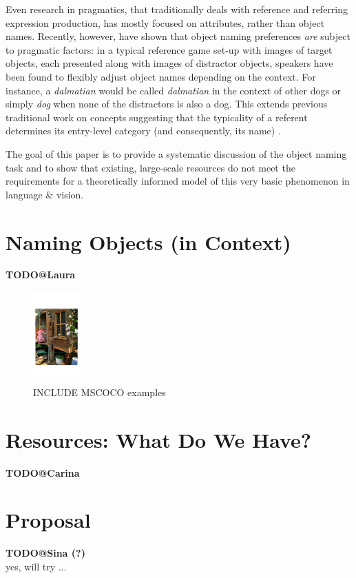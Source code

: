\documentclass[runningheads]{llncs}
\begin{document}
Even research in pragmatics, that traditionally deals with reference and referring expression production, has mostly focused on attributes, rather than object names.
Recently, however, \cite{graf2016animal} have shown that object naming preferences \textit{are} subject to pragmatic factors: in a typical reference game set-up with images of target objects, each  presented along with images of distractor objects, speakers have been found to flexibly adjust object names depending on the context. For instance, a \textit{dalmatian} would be called \textit{dalmatian} in the context of other dogs or simply \textit{dog} when none of the distractors is also a dog.
This extends previous traditional work on concepts suggesting that the typicality of a referent determines its entry-level category (and consequently, its name) \cite{Rosch1978}.

The goal of this paper is to provide a systematic discussion of the object naming task and to show that existing, large-scale resources do not meet the requirements for a theoretically informed model of this very basic phenomenon in language \& vision.


\section{Naming Objects (in Context)}
\label{sec:object_naming}
\textbf{TODO@Laura}\\



\begin{figure}
	\centering
	\includegraphics[height=3.5cm]{fig/flickr_1000268201_boxes}
	\caption{INCLUDE MSCOCO examples}
	\label{fig:example}
\end{figure}

\section{Resources: What Do We Have?}
\label{sec:resources}
\textbf{TODO@Carina}\\



\section{Proposal}
\label{sec:future_proposal}
\textbf{TODO@Sina (?)}\\


yes, will try ...

\clearpage


\end{document}
